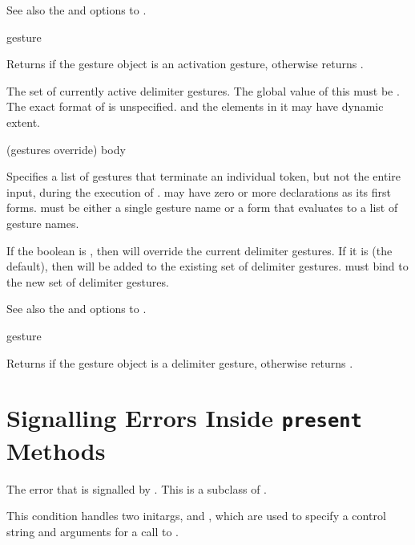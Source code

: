 See also the  and 
options to .

 {gesture}

Returns  if the gesture object  is an activation
gesture, otherwise returns .



The set of currently active delimiter gestures.  The global value of this must
be .  The exact format of  is unspecified.
 and the elements in it may have dynamic extent.

 {(gestures \key override) \body body}

Specifies a list of gestures that terminate an individual token, but not the
entire input, during the execution of .   may have zero or
more declarations as its first forms.   must be either a single
gesture name or a form that evaluates to a list of gesture names.

If the boolean  is , then  will override
the current delimiter gestures.  If it is  (the default), then
 will be added to the existing set of delimiter gestures.
 must bind  to the new set
of delimiter gestures.

See also the  and 
options to .

 {gesture}

Returns  if the gesture object  is a delimiter gesture,
otherwise returns .


\section {Signalling Errors Inside {\tt present} Methods}


The error that is signalled by .  This is a subclass of
.  

This condition handles two initargs,  and
, which are used to specify a control string and arguments
for a call to .

